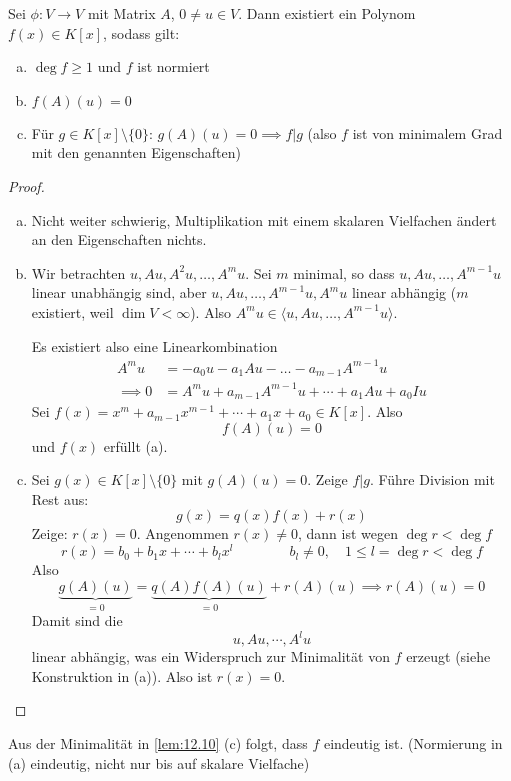 \documentclass{mycourse}
\begin{document}
\begin{lem}
\label{lem:12.10}
Sei $\phi:V\to V$ mit Matrix $A$, $0\neq u\in V$.
Dann existiert ein Polynom $f(x)\in K[x]$, sodass gilt:
\begin{enumerate}[(a)]
	\item $\deg f\ge 1$ und $f$ ist normiert
	\item $f(A)(u)=0$
\item Für $g\in K[x]\setminus \{0\}$: $g(A)(u)=0\implies f|g$ (also $f$ ist von minimalem Grad mit den genannten Eigenschaften)
\end{enumerate}

\begin{proof}
	\begin{enumerate}[(a)]
\item
	Nicht weiter schwierig, Multiplikation mit einem skalaren Vielfachen ändert an den Eigenschaften nichts.
\item Wir betrachten $u, Au, A^2u,\dotsc,A^mu$.
Sei $m$ minimal, so dass $u,Au,\dotsc,A^{m-1}u$ linear unabhängig sind, aber $u,Au,\dotsc, A^{m-1}u,A^mu$ linear abhängig
($m$ existiert, weil $\dim V <\infty$).
Also $A^mu\in \langle u,Au,\dotsc,A^{m-1}u\rangle$.

Es existiert also eine Linearkombination
\begin{align*}
A^m u &= -a_0u-a_1Au-\dotsc -a_{m-1}A^{m-1}u\\
\implies 0&= A^mu +a_{m-1}A^{m-1}u + \dotsb + a_1Au + a_0I u
\end{align*}
Sei $f(x)=x^m+a_{m-1}x^{m-1}+\dotsb +a_1x+a_0 \in K[x]$.
Also
\[
f(A)(u)=0
\]
und $f(x)$ erfüllt (a).
\item
Sei $g(x)\in K[x]\setminus\{0\}$ mit $g(A)(u) = 0$.
Zeige $f|g$.
Führe Division mit Rest aus:
\[
g(x)=q(x)f(x)+r(x)
\]
Zeige: $r(x)=0$.
Angenommen $r(x) \neq 0$, dann ist wegen $\deg r<\deg f$
\[
r(x) = b_0 +b_1x+\dotsb +b_lx^l \qquad\qquad b_l\neq 0,\quad 1\le l=\deg r <\deg f
\]
Also
\[
\underbrace{g(A)(u)}_{=0} = \underbrace{q(A)f(A)(u)}_{=0} + r(A)(u) \implies r(A)(u) = 0
\]
Damit sind die
\[
u,Au, \dotsb, A^lu
\]
linear abhängig, was ein Widerspruch zur Minimalität von $f$ erzeugt (siehe Konstruktion in (a)).
Also ist $r(x)=0$.
\end{enumerate}
\end{proof}
\end{lem}


Aus der Minimalität in \ref{lem:12.10} (c) folgt, dass $f$ eindeutig ist.
(Normierung in (a) eindeutig, nicht nur bis auf skalare Vielfache)
\end{document}
